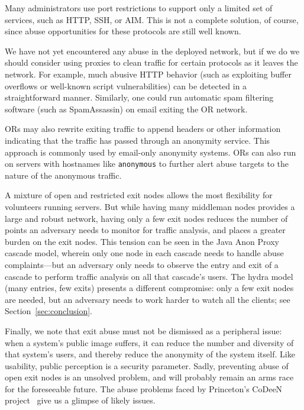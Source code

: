 \documentclass[times,10pt,twocolumn]{article}
\begin{document}
Many administrators use port restrictions to support only a
limited set of services, such as HTTP, SSH, or AIM.
This is not a complete solution, of course, since abuse opportunities for these
protocols are still well known.

We have not yet encountered any abuse in the deployed network, but if
we do we should consider using proxies to clean traffic for certain
protocols as it leaves the network.  For example, much abusive HTTP
behavior (such as exploiting buffer overflows or well-known script
vulnerabilities) can be detected in a straightforward manner.
Similarly, one could run automatic spam filtering software (such as
SpamAssassin) on email exiting the OR network.

ORs may also rewrite exiting traffic to append
headers or other information indicating that the traffic has passed
through an anonymity service.  This approach is commonly used
by email-only anonymity systems.  ORs can also
run on servers with hostnames like {\tt anonymous} to further
alert abuse targets to the nature of the anonymous traffic.

A mixture of open and restricted exit nodes allows the most
flexibility for volunteers running servers. But while having many
middleman nodes provides a large and robust network,
having only a few exit nodes reduces the number of points
an adversary needs to monitor for traffic analysis, and places a
greater burden on the exit nodes.  This tension can be seen in the
Java Anon Proxy
cascade model, wherein only one node in each cascade needs to handle
abuse complaints---but an adversary only needs to observe the entry
and exit of a cascade to perform traffic analysis on all that
cascade's users. The hydra model (many entries, few exits) presents a
different compromise: only a few exit nodes are needed, but an
adversary needs to work harder to watch all the clients; see
Section~\ref{sec:conclusion}.

Finally, we note that exit abuse must not be dismissed as a peripheral
issue: when a system's public image suffers, it can reduce the number
and diversity of that system's users, and thereby reduce the anonymity
of the system itself.  Like usability, public perception is a
security parameter.  Sadly, preventing abuse of open exit nodes is an
unsolved problem, and will probably remain an arms race for the
foreseeable future.  The abuse problems faced by Princeton's CoDeeN
project~\cite{darkside} give us a glimpse of likely issues.

\label{subsec:dirservers}
\end{document}
